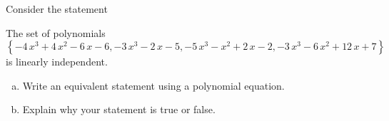 
\begin{exerciseStatement}


Consider the statement 
\begin{center}\begin{minipage}{0.8\textwidth}
 The set of polynomials \( \left\{ -4 \, x^{3} + 4 \, x^{2} - 6 \, x - 6 , -3 \, x^{3} - 2 \, x - 5 , -5 \, x^{3} - x^{2} + 2 \, x - 2 , -3 \, x^{3} - 6 \, x^{2} + 12 \, x + 7 \right\} \) is linearly independent.
\end{minipage}\end{center}
    


\begin{enumerate}[(a)]
\item  Write an equivalent statement using a polynomial equation.
\item  Explain why your statement is true or false.
\end{enumerate}
    
\end{exerciseStatement}
    
